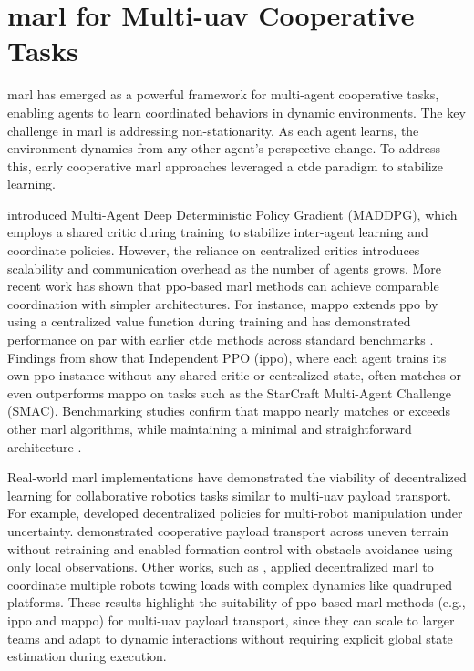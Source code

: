 \section{\gls{marl} for Multi-\gls{uav} Cooperative Tasks}

\gls{marl} has emerged as a powerful framework for multi-agent cooperative tasks, enabling agents to learn coordinated behaviors in dynamic environments. The key challenge in \gls{marl} is addressing non-stationarity. As each agent learns, the environment dynamics from any other agent's perspective change. To address this, early cooperative \gls{marl} approaches leveraged a \gls{ctde}  paradigm to stabilize learning.

\cite{Lowe2017MultiAgentAF} introduced Multi-Agent Deep Deterministic Policy Gradient (MADDPG), which employs a shared critic during training to stabilize inter-agent learning and coordinate policies. However, the reliance on centralized critics introduces scalability and communication overhead as the number of agents grows. More recent work has shown that \gls{ppo}-based \gls{marl} methods can achieve comparable coordination with simpler architectures. For instance, \gls{mappo} extends \gls{ppo} by using a centralized value function during training and has demonstrated performance on par with earlier \gls{ctde} methods across standard benchmarks \cite{yu_surprising_2022}. Findings from \cite{witt_is_2020} show that Independent PPO (\gls{ippo}), where each agent trains its own \gls{ppo} instance without any shared critic or centralized state, often matches or even outperforms \gls{mappo} on tasks such as the StarCraft Multi-Agent Challenge (SMAC). Benchmarking studies confirm that \gls{mappo} nearly matches or exceeds other \gls{marl} algorithms, while maintaining a minimal and straightforward architecture \cite{Papoudakis2020BenchmarkingMD}.

Real-world \gls{marl} implementations have demonstrated the viability of decentralized learning for collaborative robotics tasks similar to multi-\gls{uav} payload transport. For example, \cite{Chen2022TowardsHBA} developed decentralized policies for multi-robot manipulation under uncertainty. \cite{Pandit2024LearningDM} demonstrated cooperative payload transport across uneven terrain without retraining and \cite{Ji2021ReinforcementLF} enabled formation control with obstacle avoidance using only local observations. Other works, such as \cite{Chen2025DecentralizedNO}, applied decentralized \gls{marl} to coordinate multiple robots towing loads with complex dynamics like quadruped platforms. These results highlight the suitability of \gls{ppo}-based \gls{marl} methods (e.g., \gls{ippo} and \gls{mappo}) for multi-\gls{uav} payload transport, since they can scale to larger teams and adapt to dynamic interactions without requiring explicit global state estimation during execution.

